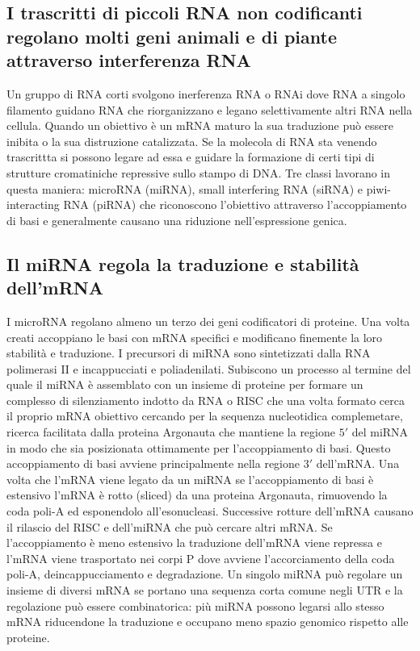 \subsection{I trascritti di piccoli RNA non codificanti regolano molti geni animali e di piante attraverso interferenza RNA}
Un gruppo di RNA corti svolgono inerferenza RNA o RNAi dove RNA a singolo filamento guidano RNA che riorganizzano e legano selettivamente altri RNA nella cellula. Quando un obiettivo \`e
un mRNA maturo la sua traduzione pu\`o essere inibita o la sua distruzione catalizzata. Se la molecola di RNA sta venendo trascrittta si possono legare ad essa e guidare la formazione
di certi tipi di strutture cromatiniche repressive sullo stampo di DNA. Tre classi lavorano in questa maniera: microRNA (miRNA), small interfering RNA (siRNA) e piwi-interacting RNA
(piRNA) che riconoscono l'obiettivo attraverso l'accoppiamento di basi e generalmente causano una riduzione nell'espressione genica.
\subsection{Il miRNA regola la traduzione e stabilit\`a dell'mRNA}
I microRNA regolano almeno un terzo dei geni codificatori di proteine. Una volta creati accoppiano le basi con mRNA specifici e modificano finemente la loro stabilit\`a e traduzione.
I precursori di miRNA sono sintetizzati dalla RNA polimerasi II e incappucciati e poliadenilati. Subiscono un processo al termine del quale il miRNA \`e assemblato con un insieme di
proteine per formare un complesso di silenziamento indotto da RNA o RISC che una volta formato cerca il proprio mRNA obiettivo cercando per la sequenza nucleotidica complemetare,
ricerca facilitata dalla proteina Argonauta che mantiene la regione $5'$ del miRNA in modo che sia posizionata ottimamente per l'accoppiamento di basi. Questo accoppiamento di basi 
avviene principalmente nella regione $3'$ dell'mRNA. Una volta che l'mRNA viene legato da un miRNA se l'accoppiamento di basi \`e estensivo l'mRNA \`e rotto (sliced) da una proteina
Argonauta, rimuovendo  la coda poli-A ed esponendolo all'esonucleasi. Successive rotture dell'mRNA causano il rilascio del RISC e dell'miRNA che pu\`o cercare altri mRNA. Se 
l'accoppiamento \`e meno estensivo la traduzione dell'mRNA viene repressa e l'mRNA viene trasportato nei corpi P dove avviene l'accorciamento della coda poli-A, deincappucciamento e 
degradazione. Un singolo miRNA pu\`o regolare un insieme di diversi mRNA se portano una sequenza corta comune negli UTR e la regolazione pu\`o essere combinatorica: pi\`u miRNA possono
legarsi allo stesso mRNA riducendone la traduzione e occupano meno spazio genomico rispetto alle proteine.
